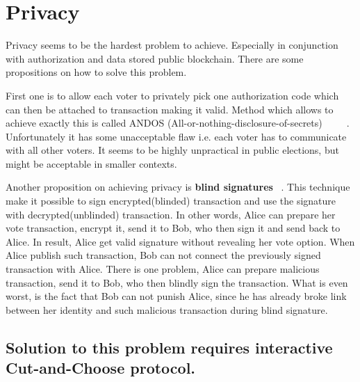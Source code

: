 \documentclass[runningheads]{llncs}
\begin{document}
\section{Privacy}
\label{privacy}
Privacy seems to be the hardest problem to achieve. Especially in conjunction with authorization and data stored public blockchain. There are some propositions on how to solve this problem. 

First one is to allow each voter to privately pick one authorization code which can then be attached to transaction making it valid. Method which allows to achieve exactly this is called ANDOS (All-or-nothing-disclosure-of-secrets) ~\cite{andos} ~\cite{salomaa1990secret} ~\cite{applied_cryptography}. Unfortunately it has some unacceptable flaw i.e. each voter has to communicate with all other voters. It seems to be highly unpractical in public elections, but might be acceptable in smaller contexts. 

Another proposition on achieving privacy is \textbf{blind signatures} ~\cite{applied_cryptography}. This technique make it possible to sign encrypted(blinded) transaction and use the signature with decrypted(unblinded) transaction. In other words, Alice can prepare her vote transaction, encrypt it, send it to Bob, who then sign it and send back to Alice. In result, Alice get valid signature without revealing her vote option. When Alice publish such transaction, Bob can not connect the previously signed transaction with Alice. 
There is one problem, Alice can prepare malicious transaction, send it to Bob, who then blindly sign the transaction. What is even worst, is the fact that Bob can not punish Alice, since he has already broke link between her identity and such malicious transaction during blind signature.

\subsection{Solution to this problem requires interactive Cut-and-Choose protocol.}
\label{cut-and-choose}
\end{document}
